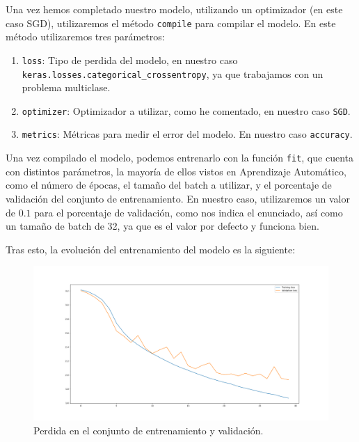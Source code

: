 \documentclass[12pt, spanish]{article}
\begin{document}
Una vez hemos completado nuestro modelo, utilizando un optimizador (en este caso SGD\cite{sgd}), utilizaremos el método \texttt{compile}\cite{compile} para compilar el modelo. En este método utilizaremos tres parámetros:

\begin{enumerate}
	\item \texttt{loss}: Tipo de perdida del modelo, en nuestro caso \texttt{keras.losses.categorical\_crossentropy}, ya que trabajamos con un problema multiclase.
	\item \texttt{optimizer}: Optimizador a utilizar, como he comentado, en nuestro caso \texttt{SGD}.
	\item \texttt{metrics}: Métricas para medir el error del modelo. En nuestro caso \texttt{accuracy}.

\end{enumerate}


Una vez compilado el modelo, podemos entrenarlo con la función \texttt{fit}, que cuenta con distintos parámetros, la mayoría de ellos vistos en Aprendizaje Automático, como el número de épocas, el tamaño del batch a utilizar, y el porcentaje de validación del conjunto de entrenamiento. En nuestro caso, utilizaremos un valor de $0.1$ para el porcentaje de validación, como nos indica el enunciado, así como un tamaño de batch de 32, ya que es el valor por defecto y funciona bien.

Tras esto, la evolución del entrenamiento del modelo es la siguiente:


\begin{figure}[H]
  \centering
      \includegraphics[width=\textwidth]{1-1-1.png}
 		\caption{Perdida en el conjunto de entrenamiento y validación.}
\end{figure}
\end{document}
